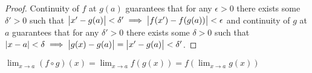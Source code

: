 \documentclass[MathsNotesBase.tex]{subfiles}
\begin{document}
{		
		\begin{proof}
			Continuity of $f$ at $g(a)$ guarantees that for any ${ \epsilon > 0 }$ there exists some ${ \delta' > 0 }$ such that ${ \left\lvert x' - g(a)\right\rvert < \delta' \implies \left\lvert f(x') - f(g(a))\right\rvert < \epsilon }$ and continuity of $g$ at $a$ guarantees that for any ${ \delta' > 0 }$ there exists some ${ \delta > 0 }$ such that ${ \left\lvert x - a\right\rvert < \delta \implies \left\lvert g(x) - g(a)\right\rvert = \left\lvert x' - g(a)\right\rvert < \delta' }$.
		\end{proof}
		\begin{corollary}
			${ \lim_{x \to a} (f \circ g)(x) = \lim_{x \to a} f(g(x)) = f(\lim_{x \to a} g(x)) }$
		\end{corollary}
	
		\bigskip
}
\end{document}
